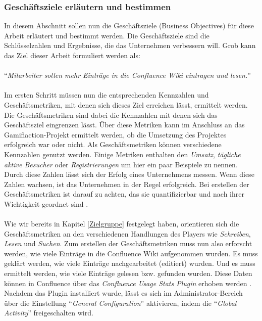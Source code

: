\documentclass[a4paper,12pt]{scrartcl}
\begin{document}
\subsubsection{Geschäftsziele erläutern und bestimmen}
\label{Geschäftsziele}
In diesem Abschnitt sollen nun die Geschäftsziele (Business Objectives) für diese Arbeit erläutert und bestimmt werden. Die Geschäftsziele sind die Schlüsselzahlen und Ergebnisse, die das Unternehmen verbessern will. Grob kann das Ziel dieser Arbeit formuliert werden als:
\\\\
\enquote{\textit{Mitarbeiter sollen mehr Einträge in die Confluence Wiki eintragen und lesen.}}
\\\\
Im ersten Schritt müssen nun die entsprechenden Kennzahlen und Geschäftsmetriken, mit denen sich dieses Ziel erreichen lässt, ermittelt werden. Die Geschäftsmetriken sind dabei die Kennzahlen mit denen sich das Geschäftsziel eingrenzen lässt. Über diese Metriken kann im Anschluss an das Gamifiaction-Projekt ermittelt werden, ob die Umsetzung des Projektes erfolgreich war oder nicht. Als Geschäftsmetriken können verschiedene Kennzahlen genutzt werden. Einige Metriken enthalten den \textit{Umsatz}, \textit{tägliche aktive Besucher} oder \textit{Registrierungen} um hier ein paar Beispiele zu nennen. Durch diese Zahlen lässt sich der Erfolg eines Unternehmens messen. Wenn diese Zahlen wachsen, ist das Unternehmen in der Regel erfolgreich. Bei erstellen der Geschäftsmetriken ist darauf zu achten, das sie quantifizierbar und nach ihrer Wichtigkeit geordnet sind \cite{Dashboard}.
\\\\
Wie wir bereits in Kapitel \ref{Zielgruppe} festgelegt haben, orientieren sich die Geschäftsmetriken an den verschiedenen Handlungen des Players wie \textit{Schreiben}, \textit{Lesen} und \textit{Suchen}. Zum erstellen der Geschäftsmetriken muss nun also erforscht werden, wie viele Einträge in die Confluence Wiki aufgenommen wurden. Es muss geklärt werden, wie viele Einträge nachgearbeitet (editiert) wurden. Und es muss ermittelt werden, wie viele Einträge gelesen bzw. gefunden wurden. Diese Daten können in Confluence über das \textit{Confluence Usage Stats Plugin} erhoben werden \cite{Plugin}. Nachdem das Plugin installiert wurde, lässt es sich im Administrator-Bereich über die Einstellung \enquote{\textit{General Configuration}} aktivieren, indem die \enquote{\textit{Global Activity}} freigeschalten wird.   
\end{document}
